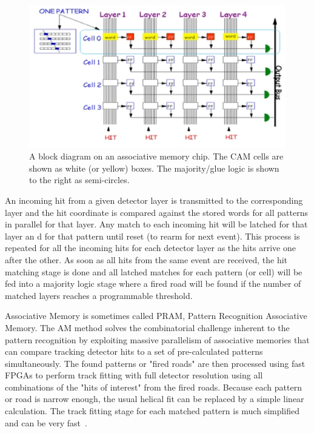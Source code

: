 \begin{figure}[ht!]
\centering
\includegraphics[width=0.9\columnwidth]{Plots/AM_pple.eps}
\caption{A block diagram on an associative memory chip. The CAM cells are shown as white (or yellow) boxes. The majority/glue logic is shown to the right as semi-circles.}
\label{fig:AM_principle_2}
\end{figure}

\noindent An incoming hit from a given detector layer is transmitted to the corresponding layer and the hit coordinate is compared against the stored words for all patterns in parallel for that layer. Any match to each incoming hit will be latched for that layer an
d for that pattern until reset (to rearm for next event). This process is repeated for all the incoming hits for each detector layer as the hits arrive one after the other. As soon as all hits from the same event are received, the hit matching stage is done and all latched matches for each pattern (or cell) will be fed into a majority logic stage where a fired road will be found if the number of matched layers reaches a programmable threshold. 
 

\noindent Associative Memory is sometimes called PRAM, Pattern Recognition Associative Memory. The AM method solves the combinatorial challenge inherent to the pattern recognition by exploiting massive parallelism of associative memories that can compare tracking detector hits to a set of pre-calculated patterns simultaneously. The found patterns or "fired roads" are then processed using fast FPGAs to perform track fitting with full detector resolution using all combinations of the "hits of interest" from the fired roads. Because each pattern or road is narrow enough, the usual helical fit can be replaced by a simple linear calculation. The track fitting stage for each matched pattern is much simplified and can be very fast~\cite{bib:Ann-09}.

